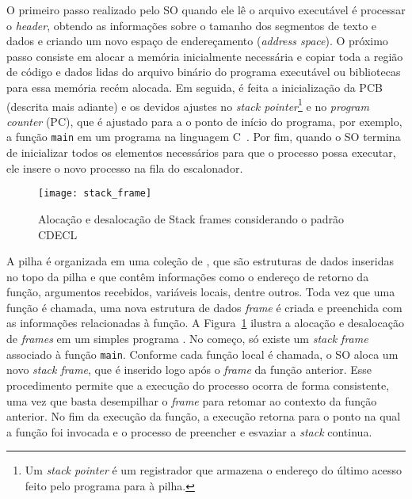 O primeiro passo realizado pelo SO quando ele lê o arquivo executável é processar o \emph{header}, obtendo as informações sobre o tamanho dos segmentos de
texto e dados e criando um novo espaço de endereçamento (\emph{address space}).
O próximo passo consiste em alocar a memória inicialmente necessária e copiar
toda a região de código e dados lidas do arquivo binário do programa executável ou bibliotecas para essa memória
recém alocada. Em seguida, é feita a inicialização da PCB (descrita mais adiante)
e os devidos ajustes no \emph{stack pointer}\footnote{Um \emph{stack pointer} é
um registrador que armazena o endereço do último acesso feito pelo programa
para à pilha.} e no \emph{program counter} (PC), que é ajustado para a
o ponto de início do programa, por exemplo, a função \texttt{main} em um programa na linguagem C~\citep{patterson}. Por fim, quando o SO termina
de inicializar todos os elementos necessários para que o processo possa
executar, ele insere o novo processo na fila do escalonador.

\begin{figure}[!h]
  \centering
  \texttt{[image: stack\_frame]}
  \caption{Alocação e desalocação de Stack frames considerando o padrão CDECL~\citep{patterson}}
  \label{fig:stack_frames} 
\end{figure}


A pilha é organizada em uma coleção de , que
são estruturas de dados inseridas no topo da pilha e que contêm
informações como o endereço de retorno da função, argumentos recebidos,
variáveis locais, dentre outros. Toda vez que uma função é chamada, uma nova
estrutura de dados \emph{frame} é criada e preenchida com as informações
relacionadas à função.  A Figura~\ref{fig:stack_frames} ilustra a alocação e
desalocação de \textit{frames} em um simples programa \citep{gdb}. No começo,
só existe um \emph{stack frame} associado à função \texttt{main}. Conforme cada
função local é chamada, o SO aloca um novo \emph{stack frame}, que é inserido
logo após o \emph{frame} da função anterior. Esse procedimento permite que a
execução do processo ocorra de forma consistente, uma vez que basta desempilhar
o \emph{frame} para retomar ao contexto da função anterior. No fim da execução
da função, a execução retorna para o ponto na qual a função foi invocada e o
processo de preencher e esvaziar a \emph{stack} continua.

